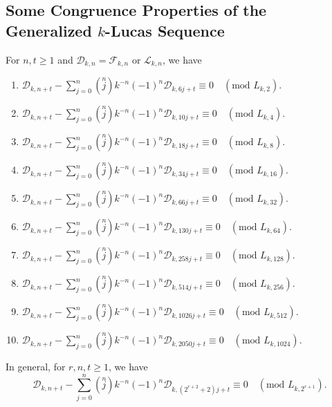 \subsection{{Some Congruence Properties of the Generalized $k$-Lucas Sequence}}
\begin{theorem}For $n, t\geq 1$ and $\mathcal{D}_{k,n}=\mathcal{F}_{k,n}$ or $\mathcal{L}_{k,n}$, we have\label{5.1}
\begin{enumerate}
\item $\mathcal{D}_{k,n+t}-\sum\limits_{j=0}^{n}\left( \stackrel{n}{j}\right) k^{-n}(-1)^{n}\mathcal{D}_{k,6j+t }\equiv 0\quad (\text{mod } L_{k,2}) $.
\item $\mathcal{D}_{k,n+t}-\sum\limits_{j=0}^{n}\left( \stackrel{n}{j}\right) k^{-n}(-1)^{n}\mathcal{D}_{k,10j+t }\equiv 0\quad (\text{mod } L_{k,4}) $.
\item $\mathcal{D}_{k,n+t}-\sum\limits_{j=0}^{n}\left( \stackrel{n}{j}\right) k^{-n}(-1)^{n}\mathcal{D}_{k,18j+t}\equiv 0\quad (\text{mod } L_{k,8}) $.
\item $\mathcal{D}_{k,n+t}-\sum\limits_{j=0}^{n}\left( \stackrel{n}{j}\right) k^{-n}(-1)^{n}\mathcal{D}_{k,34j+t}\equiv 0\quad (\text{mod } L_{k,16}) $.
\item $\mathcal{D}_{k,n+t}-\sum\limits_{j=0}^{n}\left( \stackrel{n}{j}\right) k^{-n}(-1)^{n}\mathcal{D}_{k,66j+t}\equiv 0\quad (\text{mod } L_{k,32}) $.
\item $\mathcal{D}_{k,n+t}-\sum\limits_{j=0}^{n}\left( \stackrel{n}{j}\right) k^{-n}(-1)^{n}\mathcal{D}_{k,130j+t}\equiv 0\quad (\text{mod } L_{k,64}) $.
\item $\mathcal{D}_{k,n+t}-\sum\limits_{j=0}^{n}\left( \stackrel{n}{j}\right) k^{-n}(-1)^{n}\mathcal{D}_{k,258j+t}\equiv 0\quad (\text{mod } L_{k,128}) $.
\item $\mathcal{D}_{k,n+t}-\sum\limits_{j=0}^{n}\left( \stackrel{n}{j}\right) k^{-n}(-1)^{n}\mathcal{D}_{k,514j+t}\equiv 0\quad (\text{mod } L_{k,256}) $.
\item $\mathcal{D}_{k,n+t}-\sum\limits_{j=0}^{n}\left( \stackrel{n}{j}\right) k^{-n}(-1)^{n}\mathcal{D}_{k,1026j+t}\equiv 0\quad (\text{mod } L_{k,512}) $.
\item $\mathcal{D}_{k,n+t}-\sum\limits_{j=0}^{n}\left( \stackrel{n}{j}\right) k^{-n}(-1)^{n}\mathcal{D}_{k,2050j+t}\equiv 0\quad (\text{mod } L_{k,1024}) $.
\end{enumerate}
In general, for $r, n,t\geq 1$, we have
$$\mathcal{D}_{k,n+t}-\sum\limits_{j=0}^{n}\left( \stackrel{n}{j}\right) k^{-n}(-1)^{n}\mathcal{D}_{k,(2^{r+2}+2)j+t} \equiv 0\quad (\text{mod } {L_{k,2^{r+1}}}). $$
\end{theorem}

